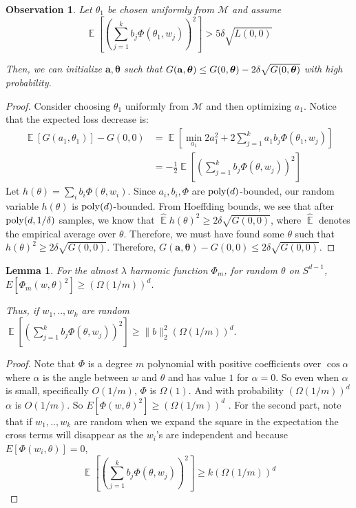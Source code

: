 \documentclass{article}
\newtheorem{lemma}[theorem]{Lemma}
\newtheorem{observation}[theorem]{Observation}
\DeclareMathOperator*{\expt}{\mathbb{E}}
\begin{document}
 \begin{observation}\label{initialize}
Let $\theta_1$ be chosen uniformly from $\mathcal{M}$ and assume
\[ \expt\left[\left(  \sum_{j=1}^k b_j \Phi(\theta_1,w_j)\right)^2\right] > 5\delta\sqrt{L(0,0)}\] 

Then, we can initialize $\boldsymbol{a,\theta}$ such that $G({\bf a, \boldsymbol{\theta}}) \leq G(0,\boldsymbol{\theta}) - 2\delta\sqrt{G(0,\boldsymbol{\theta})}$ with high probability.
 \end{observation}
 
 \begin{proof}
   Consider choosing $\theta_1$ uniformly from $\mathcal{M}$ and then
   optimizing $a_1$. Notice that the expected loss decrease is:
%
\begin{align*}
  \expt[ G(a_1,\theta_1)] - G(0,0) & = \expt\left [\min_{a_1} 2a_1^2 +
  2\sum_{j=1}^k a_1 b_j\Phi(\theta_1,w_j)\right] \\
 & = -\frac{1}{2}\expt\left[\left(  \sum_{j=1}^k b_j
   \Phi(\theta,w_j)\right)^2\right] 
\end{align*}
Let
$h(\theta) = \sum_i b_i \Phi(\theta, w_i)$. Since $a_i,b_i, \Phi$ are
$\mathrm{poly}(d)$-bounded, our random variable $h(\theta)$ is
$\mathrm{poly}(d)$-bounded. From Hoeffding bounds, we see that after
$\mathrm{poly}(d,1/\delta)$ samples, we know that
$\hat{\expt}h(\theta)^2 \geq 2\delta\sqrt{G(0,0)}$, where
$\hat{\expt}$ denotes the empirical average over $\theta$. Therefore,
we must have found some $\theta$ such that
$h(\theta)^2 \geq 2\delta \sqrt{G(0,0)}$. Therefore,
$G(\boldsymbol{a,\theta}) - G(0,0) \leq 2\delta \sqrt{G(0,0)}$.
\end{proof}
 
 \begin{lemma} 
   For the almost $\lambda$ harmonic function $\Phi_m$, for random
   $\theta$ on $S^{d-1}$,
   $E[\Phi_m(w,\theta)^2] \geq \left(\Omega(1/m)\right)^d$.

Thus, if $w_1,..,w_k$ are random $\expt\left[\left(  \sum_{j=1}^k b_j \Phi(\theta,w_j)\right)^2\right] \geq \|b\|_2^2 \left(\Omega(1/m)\right)^d.$
\end{lemma}
%
\begin{proof}
Note that $\Phi$ is a degree $m$ polynomial with positive coefficients over $\cos \alpha$ where $\alpha$ is the angle between $w$ and $\theta$ and has value $1$ for $\alpha = 0$. So even when $\alpha$ is small, specifically  $O(1/m)$, $\Phi$ is $\Omega(1)$. And with probability $(\Omega(1/m))^d$ $\alpha$ is  $O(1/m)$. So
$E[\Phi(w,\theta)^2] \geq  (\Omega(1/m))^d$ .   
For the second part, note that if $w_1,..,w_k$  are random  when we expand the square in the expectation the cross terms will disappear as the $w_i$'s are independent and because  $E[\Phi(w_i,\theta)]=0$,
 \[ \expt\left[\left(  \sum_{j=1}^k b_j
     \Phi(\theta,w_j)\right)^2\right] \ge k \left(\Omega(1/m)\right)^d\]
\end{proof}
\end{document}
